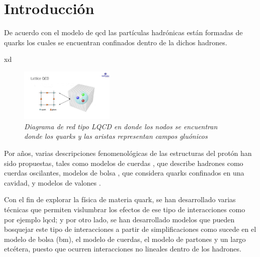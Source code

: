 \chapter*{Introducción}

\pagestyle{fancy}
\fancyhf{} %



De acuerdo con el modelo de \acrfull{qcd} las partículas hadrónicas están formadas de quarks los cuales se encuentran confinados dentro de la dichos hadrones.

xd

\begin{figure}
\centering
\includegraphics[width=0.4\textwidth]{./Images/LQCD.jpg}
\caption[Red LQCD]{\emph{Diagrama de red tipo LQCD en donde los nodos se encuentran donde los quarks y las aristas representan campos gluónicos}}
\label{fig: LQCD}
\end{figure}

Por años, varias descripciones fenomenológicas de las estructuras del protón han sido propuestas, tales como modelos de cuerdas \cite{Artru1974, Andersson_1983} \cite{Artru1974, Andersson_1983}, que describe hadrones como cuerdas oscilantes, modelos de bolsa \cite{AIHPA_1968__8_2_163_0,DeTar_1983}, que considera quarks confinados en una cavidad, y modelos de valones \cite{Hwa_1981}.

Con el fin de explorar la física de materia quark, se han desarrollado varias técnicas que permiten vislumbrar los efectos de ese tipo de interacciones como por ejemplo \acrfull{lqcd}; y por otro lado, se han desarrollado modelos que pueden bosquejar este tipo de interacciones a partir de simplificaciones como sucede en el modelo de bolsa (\acrfull{bm}), el modelo de cuerdas, el modelo de partones y un largo etcétera\cite{DeTar_1983}, puesto que ocurren interacciones no lineales dentro de los hadrones. 

